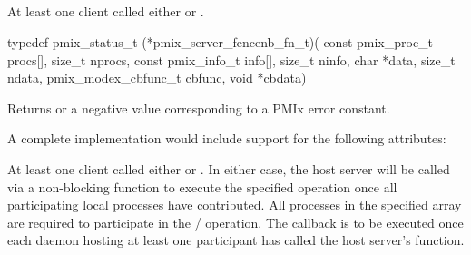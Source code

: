 \subsection{}

\summary

At least one client called either  or .

\format

\cspecificstart
\begin{codepar}
typedef pmix_status_t (*pmix_server_fencenb_fn_t)(
                             const pmix_proc_t procs[], size_t nprocs,
                             const pmix_info_t info[], size_t ninfo,
                             char *data, size_t ndata,
                             pmix_modex_cbfunc_t cbfunc, void *cbdata)
\end{codepar}
\cspecificend

\begin{arglist}
\end{arglist}

Returns  or a negative value corresponding to a PMIx error constant.

\optattr
A complete implementation would include support for the following attributes:


\descr

At least one client called either  or .
In either case, the host server will be called via a non-blocking function to execute the specified operation once all participating local processes have contributed.
All processes in the specified  array are required to participate in the / operation.
The callback is to be executed once each daemon hosting at least one participant has called the host server's  function.

